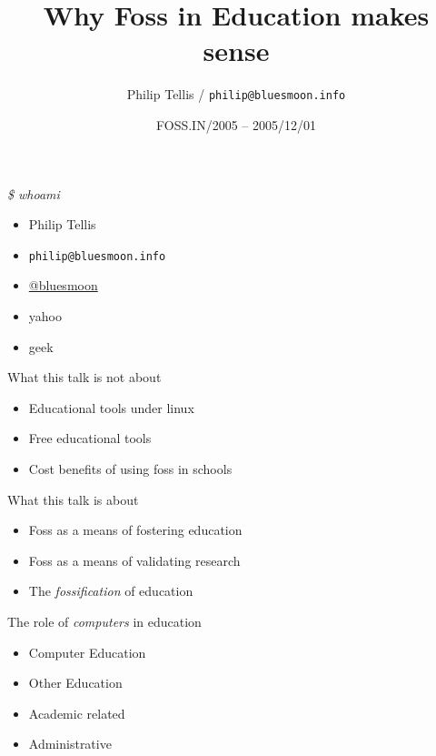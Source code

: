 \documentclass{beamer}
\author{Philip Tellis / \texttt{philip@bluesmoon.info}}
\institute{Yahoo!}
\title{Why Foss in Education makes sense}
\date{FOSS.IN/2005 -- 2005/12/01}
\begin{document}
\begin{frame}
  \titlepage
\end{frame}


\begin{frame}{\textit{\$ whoami}}
  \begin{itemize}
  \item Philip Tellis
  \item \small{\texttt{philip@bluesmoon.info}}
  \item \href{http://twitter.com/bluesmoon}{@bluesmoon}
  \item yahoo
  \item geek
  \end{itemize}
\end{frame}

\begin{frame}{What this talk is not about}
   \begin{itemize}
   \item Educational tools under linux
   \item Free educational tools
   \item Cost benefits of using foss in schools
   \end{itemize}
\end{frame}

\begin{frame}{What this talk is about}
   \begin{itemize}
   \item Foss as a means of fostering education
   \item Foss as a means of validating research
   \item The \textit{fossification} of education
   \end{itemize}
\end{frame}

\begin{frame}{The role of \textit{computers} in education}
   \begin{itemize}
   \item Computer Education
   \item Other Education
   \item Academic related
   \item Administrative
   \end{itemize}
\end{frame}
\end{document}

